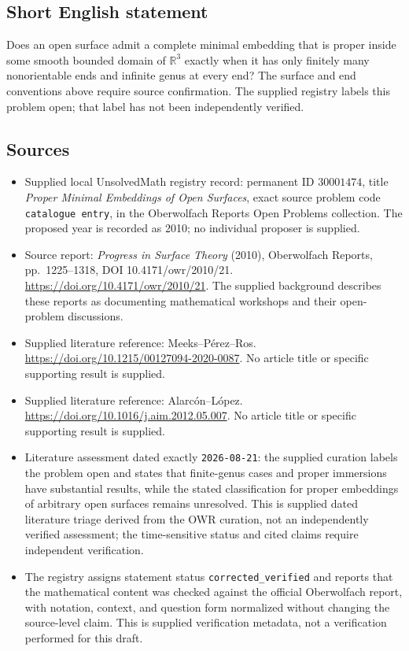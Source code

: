 \documentclass[11pt]{article}
\newcommand{\R}{\mathbb{R}}
\begin{document}
\subsection{Short English statement}
Does an open surface admit a complete minimal embedding that is proper inside some smooth bounded domain of \(\R^3\) exactly when it has only finitely many nonorientable ends and infinite genus at every end? The surface and end conventions above require source confirmation. The supplied registry labels this problem open; that label has not been independently verified.
\subsection{Sources}
\begin{itemize}
\item Supplied local UnsolvedMath registry record: permanent ID \(30001474\), title \emph{Proper Minimal Embeddings of Open Surfaces}, exact source problem code \texttt{catalogue entry}, in the Oberwolfach Reports Open Problems collection. The proposed year is recorded as 2010; no individual proposer is supplied.
\item Source report: \emph{Progress in Surface Theory} (2010), Oberwolfach Reports, pp.~1225--1318, DOI 10.4171/owr/2010/21. \url{https://doi.org/10.4171/owr/2010/21}. The supplied background describes these reports as documenting mathematical workshops and their open-problem discussions.
\item Supplied literature reference: Meeks--P\'erez--Ros. \url{https://doi.org/10.1215/00127094-2020-0087}. No article title or specific supporting result is supplied.
\item Supplied literature reference: Alarc\'on--L\'opez. \url{https://doi.org/10.1016/j.aim.2012.05.007}. No article title or specific supporting result is supplied.
\item Literature assessment dated exactly \texttt{2026-08-21}: the supplied curation labels the problem open and states that finite-genus cases and proper immersions have substantial results, while the stated classification for proper embeddings of arbitrary open surfaces remains unresolved. This is supplied dated literature triage derived from the OWR curation, not an independently verified assessment; the time-sensitive status and cited claims require independent verification.
\item The registry assigns statement status \texttt{corrected\_verified} and reports that the mathematical content was checked against the official Oberwolfach report, with notation, context, and question form normalized without changing the source-level claim. This is supplied verification metadata, not a verification performed for this draft.
\end{itemize}
\end{document}

